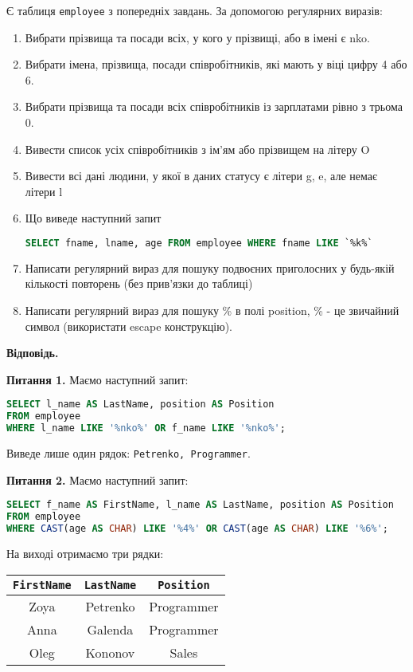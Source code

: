 \documentclass{hw_template}
\begin{document}
\begin{problem}
    Є таблиця \texttt{employee} з попередніх завдань. За допомогою регулярних виразів:
    \begin{enumerate}
        \item Вибрати прізвища та посади всіх, у кого у прізвищі, або в імені є nko.
        \item Вибрати імена, прізвища, посади співробітників, які мають у віці цифру 4 або 6.
        \item Вибрати прізвища та посади всіх співробітників із зарплатами рівно з трьома 0.
        \item Вивести список усіх співробітників з ім'ям або прізвищем на літеру O
        \item Вивести всі дані людини, у якої в даних статусу є літери g, e, але немає літери l
        \item Що виведе наступний запит
        \begin{lstlisting}[language=SQL]
SELECT fname, lname, age FROM employee WHERE fname LIKE `%k%`
        \end{lstlisting}
        \item Написати регулярний вираз для пошуку подвоєних приголосних у будь-якій кількості
        повторень (без прив'язки до таблиці)
        \item Написати регулярний вираз для пошуку \% в полі position, \% - це звичайний символ
        (використати escape конструкцію).
    \end{enumerate}
\end{problem}

\textbf{Відповідь.}

\textbf{Питання 1.} Маємо наступний запит:
\begin{lstlisting}[language=SQL]
SELECT l_name AS LastName, position AS Position
FROM employee
WHERE l_name LIKE '%nko%' OR f_name LIKE '%nko%';
\end{lstlisting}

Виведе лише один рядок: \texttt{Petrenko, Programmer}.

\textbf{Питання 2.} Маємо наступний запит:
\begin{lstlisting}[language=SQL]
SELECT f_name AS FirstName, l_name AS LastName, position AS Position
FROM employee
WHERE CAST(age AS CHAR) LIKE '%4%' OR CAST(age AS CHAR) LIKE '%6%';
\end{lstlisting}

На виході отримаємо три рядки:

\begin{table}[H]
    \centering
    \begin{tabular}{|c|c|c|}
        \hline
        \texttt{FirstName} & \texttt{LastName} & \texttt{Position} \\
        \hline
        Zoya & Petrenko & Programmer \\
        Anna & Galenda & Programmer \\
        Oleg & Kononov & Sales \\
        \hline
    \end{tabular}
\end{table}
\end{document}
